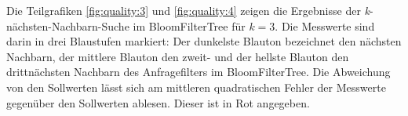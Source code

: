 Die Teilgrafiken \ref{fig:quality:3} und \ref{fig:quality:4} zeigen die Ergebnisse der \textit{k}-nächsten-Nachbarn-Suche im BloomFilterTree für $k=3$. Die Messwerte sind darin in drei Blaustufen markiert: Der dunkelste Blauton bezeichnet den nächsten Nachbarn, der mittlere Blauton den zweit- und der hellste Blauton den drittnächsten Nachbarn des Anfragefilters im BloomFilterTree. Die Abweichung von den Sollwerten lässt sich am mittleren quadratischen Fehler der Messwerte gegenüber den Sollwerten ablesen. Dieser ist in Rot angegeben. 
\begin{figure}[hpbt]
	\centering
	\label{fig:quality}
 	\hspace{0.01\textwidth}
 	\\[0pt]

\end{figure}
